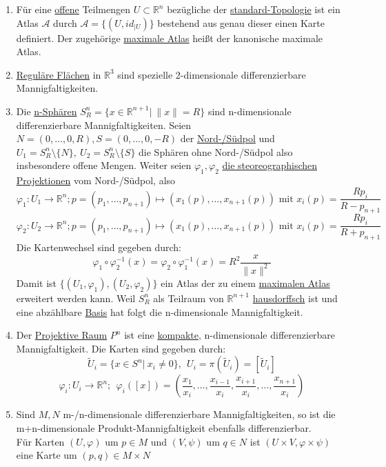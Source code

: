 \begin{rawDef}
\begin{enumerate}
	\item Für eine \hyperref[offen]{offene} Teilmengen $U\subset\mathbb{R}^n$ bezügliche der \hyperref[stdTopo]{standard-Topologie} ist ein Atlas $\mathcal{A}$ durch $\mathcal{A}=\{(U,id_{|U})\}$ bestehend aus genau dieser einen Karte definiert. Der zugehörige \hyperref[maxAtlas]{maximale Atlas} heißt der kanonische maximale Atlas.
	\item \hyperref[regFlaeche]{Reguläre Flächen} in $\mathbb{R}^3$ sind spezielle 2-dimensionale differenzierbare Mannigfaltigkeiten.
	\item Die \hyperref[ndimsphere]{n-Sphären} $S^n_R=\{x\in\mathbb{R}^{n+1}|\ \lVert x\rVert=R\}$ sind n-dimensionale differenzierbare Mannigfaltigkeiten. Seien $N=(0,\ldots,0,R), S=(0,\ldots,0,-R)$ der \hyperref[pol]{Nord-/Südpol} und $U_1=S_R^n\setminus\{N\},\: U_2=S_R^n\setminus\{S\}$ die Sphären ohne Nord-/Südpol also insbesondere offene Mengen. Weiter seien $\varphi_1,\varphi_2$ \hyperref[stereoproj]{die steoreographischen Projektionen} vom Nord-/Südpol, also
	$$\varphi_1:U_1\to\mathbb{R}^n;p=(p_1,\ldots,p_{n+1})\mapsto(x_1(p),\ldots,x_{n+1}(p)) \text{  mit }x_i(p)=\frac{Rp_i}{R-p_{n+1}}$$
	$$\varphi_2:U_2\to\mathbb{R}^n;p=(p_1,\ldots,p_{n+1})\mapsto(x_1(p),\ldots,x_{n+1}(p)) \text{  mit }x_i(p)=\frac{Rp_i}{R+p_{n+1}}$$
	Die Kartenwechsel sind gegeben durch:
	$$\varphi_1\circ\varphi_2^{-1}(x)=\varphi_2\circ\varphi_1^{-1}(x)=R^2\frac{x}{\lVert x\rVert^2}$$
	Damit ist $\{(U_1,\varphi_1),(U_2,\varphi_2)\}$ ein Atlas der zu einem \hyperref[maxAtlas]{maximalen Atlas} erweitert werden kann. Weil $S_R^n$ als Teilraum von $\mathbb{R}^{n+1}$ \hyperref[hausdorffsch]{hausdorffsch} ist und eine abzählbare \hyperref[basisTopo]{Basis} hat folgt die n-dimensionale Mannigfaltigkeit.
	\item Der \hyperref[projRaum]{Projektive Raum} $P^n$ ist eine \hyperref[kompakt]{kompakte}, n-dimensionale differenzierbare Mannigfaltigkeit. Die Karten sind gegeben durch:
	$$\tilde{U}_i=\{x\in S^n|\ x_i\neq0\},\:\: U_i=\pi(\tilde{U}_i)=[\tilde{U}_i]$$
	$$\varphi_i:U_i\to\mathbb{R}^n;\:\: \varphi_i([x])=\left(\frac{x_1}{x_i},\ldots, \frac{x_{i-1}}{x_i},\frac{x_{i+1}}{x_i},\ldots,\frac{x_{n+1}}{x_i}\right)$$
	\item Sind $M,N$ m-/n-dimensionale differenzierbare Mannigfaltigkeiten, so ist die m+n-dimensionale Produkt-Mannigfaltigkeit ebenfalls differenzierbar.\\
	Für Karten $(U,\varphi)$ um $p\in M$ und $(V,\psi)$ um $q\in N$ ist $(U\times V,\varphi\times\psi)$ eine Karte um $(p,q)\in M\times N$
\end{enumerate}
\end{rawDef}

